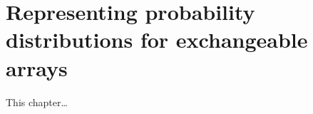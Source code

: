 
\inbpdocument

\chapter{Representing probability distributions for exchangeable arrays}
\label{ch:arrays}

This chapter\dots

\outbpdocument{


}
